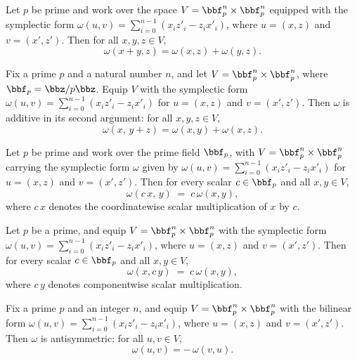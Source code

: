 \begin{lemma}
\label{sym_form_add_left}
\label{sym_form_add_right}
\label{sym_form_smul_left}
\label{sym_form_smul_right}
\leanok
{}
Let $p$ be prime and work over the space $V = \bbf_p^n \times \bbf_p^n$ equipped with
the symplectic form $\omega(u,v) = \sum_{i=0}^{n-1}(x_i z'_i - z_i x'_i)$, where $u =
(x,z)$ and $v = (x',z')$. Then for all $x, y, z \in V$,
\[
\omega(x + y, z) = \omega(x, z) + \omega(y, z).
\]

Fix a prime $p$ and a natural number $n$, and let $V = \bbf_p^n \times \bbf_p^n$, where
$\bbf_p = \bbz/p\bbz$. Equip $V$ with the symplectic form $\omega(u,v) =
\sum_{i=0}^{n-1}(x_i z'_i - z_i x'_i)$ for $u = (x,z)$ and $v = (x',z')$. Then $\omega$
is additive in its second argument: for all $x, y, z \in V$, \[ \omega(x,\, y + z) =
\omega(x,y) + \omega(x,z). \]

Let $p$ be prime and work over the prime field $\bbf_p$, with $V = \bbf_p^n \times
\bbf_p^n$ carrying the symplectic form $\omega$ given by $\omega(u,v) =
\sum_{i=0}^{n-1}(x_i z'_i - z_i x'_i)$ for $u=(x,z)$ and $v=(x',z')$. Then for every
scalar $c \in \bbf_p$ and all $x, y \in V$,
\[
\omega(c\,x,\, y) \;=\; c\,\omega(x, y),
\]
where $c\,x$ denotes the coordinatewise scalar multiplication of $x$ by $c$.

Let $p$ be a prime, and equip $V = \bbf_p^n \times \bbf_p^n$ with the symplectic form
$\omega(u,v) = \sum_{i=0}^{n-1}(x_i z'_i - z_i x'_i)$, where $u = (x,z)$ and $v =
(x',z')$. Then for every scalar $c \in \bbf_p$ and all $x, y \in V$,
\[
\omega(x, c\,y) \;=\; c\,\omega(x, y),
\]
where $c\,y$ denotes componentwise scalar multiplication.
\end{lemma}

\begin{lemma}
\label{sym_form_swap}
\leanok
{}
Fix a prime $p$ and an integer $n$, and equip $V = \bbf_p^n \times \bbf_p^n$ with the
bilinear form $\omega(u,v) = \sum_{i=0}^{n-1}(x_i z'_i - z_i x'_i)$, where $u = (x,z)$
and $v = (x',z')$. Then $\omega$ is antisymmetric: for all $u, v \in V$, \[ \omega(u,v)
= -\,\omega(v,u). \]
\end{lemma}

